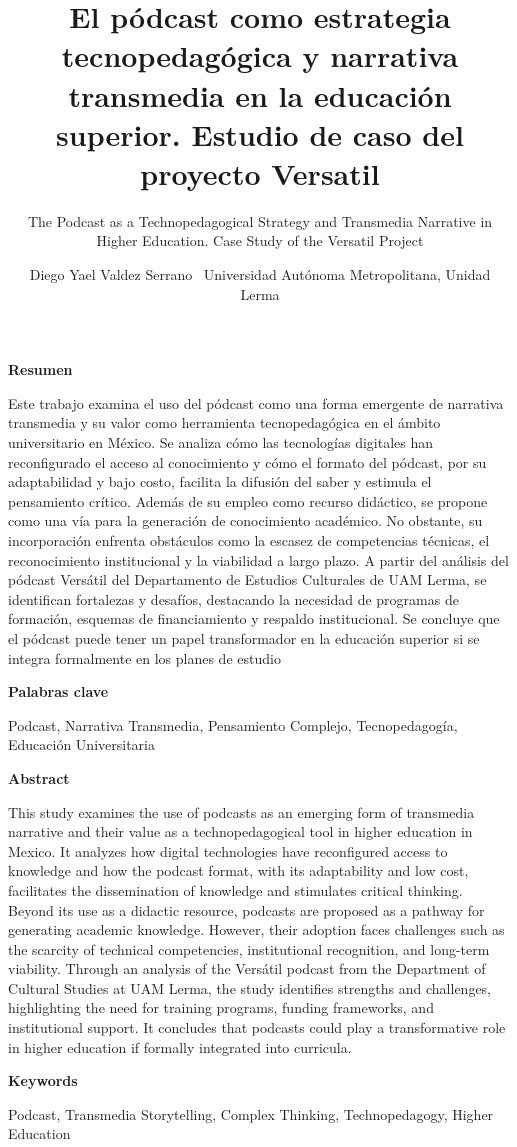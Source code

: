 \documentclass[
]{interact}
\title{El pódcast como estrategia tecnopedagógica y narrativa transmedia
en la educación superior. Estudio de caso del proyecto Versatil}
\subtitle{The Podcast as a Technopedagogical Strategy and Transmedia
Narrative in Higher Education. Case Study of the Versatil Project}
\author{Diego Yael Valdez Serrano \bullet\ 
Universidad Autónoma Metropolitana, Unidad Lerma}
\begin{document}
\captionsetup{labelsep=space}
\maketitle


\newcommand{\articuloTitulo}{El podcast como estrategia tecnopedagógica}

\begin{footnotesize}
\textbf{Resumen}

Este trabajo examina el uso del pódcast como una forma emergente de narrativa transmedia y su valor como herramienta tecnopedagógica en el ámbito universitario en México. Se analiza cómo las tecnologías digitales han reconfigurado el acceso al conocimiento y cómo el formato del pódcast, por su adaptabilidad y bajo costo, facilita la difusión del saber y estimula el pensamiento crítico. Además de su empleo como recurso didáctico, se propone como una vía para la generación de conocimiento académico. No obstante, su incorporación enfrenta obstáculos como la escasez de competencias técnicas, el reconocimiento institucional y la viabilidad a largo plazo. A partir del análisis del pódcast Versátil del Departamento de Estudios Culturales de UAM Lerma, se identifican fortalezas y desafíos, destacando la necesidad de programas de formación, esquemas de financiamiento y respaldo institucional. Se concluye que el pódcast puede tener un papel transformador en la educación superior si se integra formalmente en los planes de estudio

\textbf{Palabras clave}

Podcast, Narrativa Transmedia, Pensamiento Complejo, Tecnopedagogía, Educación Universitaria
\end{footnotesize}

\newpage

\begin{footnotesize}
\textbf{Abstract}

This study examines the use of podcasts as an emerging form of transmedia narrative and their value as a technopedagogical tool in higher education in Mexico. It analyzes how digital technologies have reconfigured access to knowledge and how the podcast format, with its adaptability and low cost, facilitates the dissemination of knowledge and stimulates critical thinking. Beyond its use as a didactic resource, podcasts are proposed as a pathway for generating academic knowledge. However, their adoption faces challenges such as the scarcity of technical competencies, institutional recognition, and long-term viability. Through an analysis of the Versátil podcast from the Department of Cultural Studies at UAM Lerma, the study identifies strengths and challenges, highlighting the need for training programs, funding frameworks, and institutional support. It concludes that podcasts could play a transformative role in higher education if formally integrated into curricula.

\textbf{Keywords}

Podcast, Transmedia Storytelling, Complex Thinking, Technopedagogy, Higher Education
\end{footnotesize}
\end{document}
